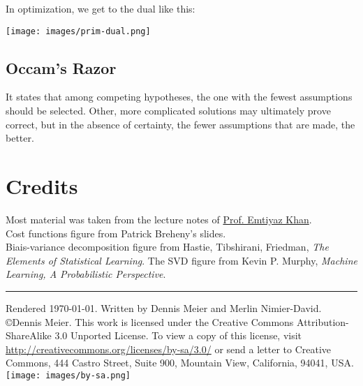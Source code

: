 \documentclass[10pt,a4paper,landscape]{article}
\begin{document}
\begin{multicols*}{4}
In optimization, we get to the dual like this:
\begin{colfig}
  \centering
  \texttt{[image: images/prim-dual.png]}
\end{colfig}



\subsection{Occam's Razor}
It states that among competing hypotheses, the one with the fewest assumptions should be selected. Other, more complicated solutions may ultimately prove correct, but in the absence of certainty, the fewer assumptions that are made, the better.



\section{Credits}
Most material was taken from the lecture notes of \href{http://people.epfl.ch/228491}{Prof. Emtiyaz Khan}.\\
Cost functions figure from Patrick Breheny's slides.\\
Biais-variance decomposition figure from Hastie, Tibshirani, Friedman, \textit{The Elements of Statistical Learning}.
The SVD figure from Kevin P. Murphy, \textit{Machine Learning, A Probabilistic Perspective}.

\hrule
\tiny
Rendered \today. Written by Dennis Meier and Merlin Nimier-David.
\copyright Dennis Meier. This work is licensed under the Creative Commons Attribution-ShareAlike 3.0 Unported License.
To view a copy of this license, visit \href{http://creativecommons.org/licenses/by-sa/3.0/}{http://creativecommons.org/licenses/by-sa/3.0/} or
send a letter to Creative Commons, 444 Castro Street, Suite 900, Mountain View, California, 94041, USA.
\texttt{[image: images/by-sa.png]}

\end{multicols*}
\end{document}
